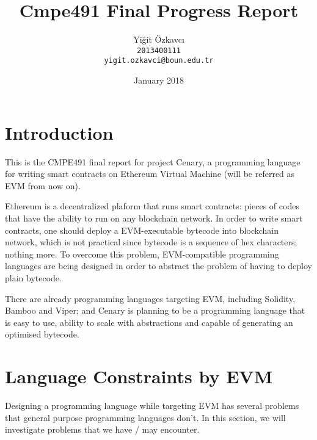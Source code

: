 \documentclass{article}
\title{Cmpe491 Final Progress Report}
\author{
  Yiğit Özkavcı \\
  \texttt{2013400111} \\
  \texttt{yigit.ozkavci@boun.edu.tr}
}
\date{January 2018}
\begin{document}

\maketitle

\tableofcontents


\section{Introduction}
\par 
\par This is the CMPE491 final report for project Cenary, a programming language for writing smart contracts on Ethereum Virtual Machine (will be referred as EVM from now on).
\par Ethereum is a decentralized plaform that runs smart contracts: pieces of codes that have the ability to run on any blockchain network. In order to write smart contracts, one should deploy a EVM-executable bytecode into blockchain network, which is not practical since bytecode is a sequence of hex characters; nothing more. To overcome this problem, EVM-compatible programming languages are being designed in order to abstract the problem of having to deploy plain bytecode. 
\par There are already programming languages targeting EVM, including Solidity\cite{solidity}, Bamboo\cite{bamboo} and Viper\cite{viper}; and Cenary is planning to be a programming language that is easy to use, ability to scale with abstractions and capable of generating an optimised bytecode.

\section{Language Constraints by EVM}
Designing a programming language while targeting EVM has several problems that general purpose programming languages don't. In this section, we will investigate problems that we have / may encounter.
\end{document}
